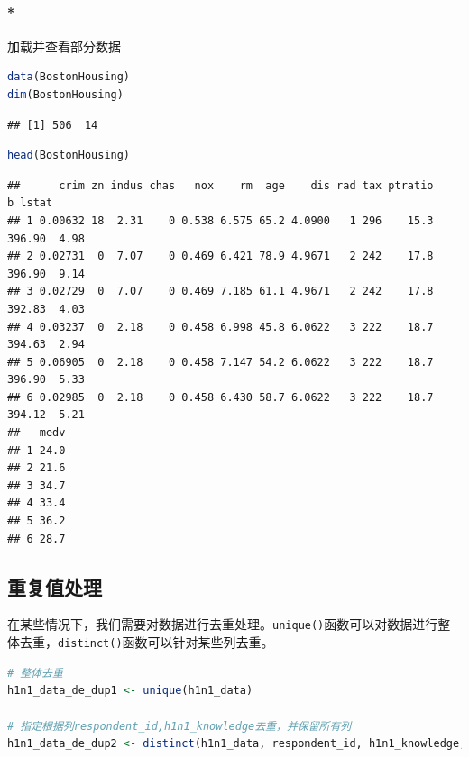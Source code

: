 \documentclass[]{ctexbook}
\let\oldparagraph\paragraph
\renewcommand{\paragraph}[1]{\oldparagraph{#1}\mbox{}}
\newcommand{\passthrough}[1]{#1}
\begin{document}
\hypertarget{ux52a0ux8f7dux5e76ux67e5ux770bux90e8ux5206ux6570ux636e-1}{%
\paragraph*{加载并查看部分数据}\label{ux52a0ux8f7dux5e76ux67e5ux770bux90e8ux5206ux6570ux636e-1}}

\begin{lstlisting}[language=R]
data(BostonHousing)
dim(BostonHousing)
\end{lstlisting}

\begin{lstlisting}
## [1] 506  14
\end{lstlisting}

\begin{lstlisting}[language=R]
head(BostonHousing)
\end{lstlisting}

\begin{lstlisting}
##      crim zn indus chas   nox    rm  age    dis rad tax ptratio      b lstat
## 1 0.00632 18  2.31    0 0.538 6.575 65.2 4.0900   1 296    15.3 396.90  4.98
## 2 0.02731  0  7.07    0 0.469 6.421 78.9 4.9671   2 242    17.8 396.90  9.14
## 3 0.02729  0  7.07    0 0.469 7.185 61.1 4.9671   2 242    17.8 392.83  4.03
## 4 0.03237  0  2.18    0 0.458 6.998 45.8 6.0622   3 222    18.7 394.63  2.94
## 5 0.06905  0  2.18    0 0.458 7.147 54.2 6.0622   3 222    18.7 396.90  5.33
## 6 0.02985  0  2.18    0 0.458 6.430 58.7 6.0622   3 222    18.7 394.12  5.21
##   medv
## 1 24.0
## 2 21.6
## 3 34.7
## 4 33.4
## 5 36.2
## 6 28.7
\end{lstlisting}

\hypertarget{ux91cdux590dux503cux5904ux7406}{%
\subsection{重复值处理}\label{ux91cdux590dux503cux5904ux7406}}

在某些情况下，我们需要对数据进行去重处理。\passthrough{\lstinline!unique()!}函数可以对数据进行整体去重，\passthrough{\lstinline!distinct()!}函数可以针对某些列去重。

\begin{lstlisting}[language=R]
# 整体去重
h1n1_data_de_dup1 <- unique(h1n1_data)

# 指定根据列respondent_id,h1n1_knowledge去重，并保留所有列
h1n1_data_de_dup2 <- distinct(h1n1_data, respondent_id, h1n1_knowledge, .keep_all = T)
\end{lstlisting}
\end{document}
